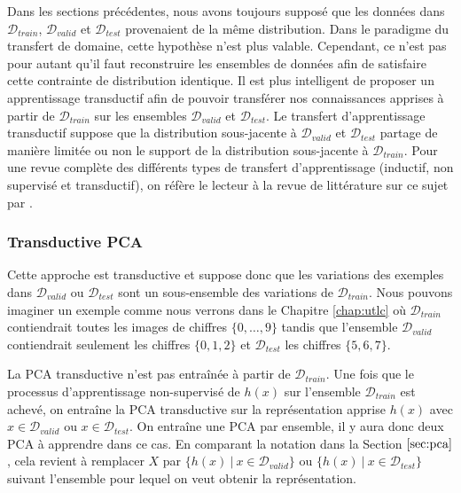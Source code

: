 Dans les sections précédentes, nous avons toujours supposé que les données dans
$\mathcal{D}_{train}$, $\mathcal{D}_{valid}$ et $\mathcal{D}_{test}$
provenaient de la même distribution. Dans le paradigme du transfert de domaine,
cette hypothèse n'est plus valable. Cependant, ce n'est pas pour autant qu'il
faut reconstruire les ensembles de données afin de satisfaire cette
contrainte de distribution identique. Il est plus intelligent de proposer un
apprentissage transductif afin de pouvoir transférer nos connaissances apprises
à partir de $\mathcal{D}_{train}$ sur les ensembles $\mathcal{D}_{valid}$ et
$\mathcal{D}_{test}$. Le transfert d'apprentissage transductif suppose que la
distribution sous-jacente à $\mathcal{D}_{valid}$ et $\mathcal{D}_{test}$
partage de manière limitée ou non le support de la distribution sous-jacente à
$\mathcal{D}_{train}$. Pour une revue complète des différents types de
transfert d'apprentissage (inductif, non supervisé et transductif), on réfère
le lecteur à la revue de littérature sur ce sujet par \citep{Pan-transfer}.

\subsubsection{Transductive PCA}

Cette approche est transductive et suppose donc que les variations des exemples
dans $\mathcal{D}_{valid}$ ou $\mathcal{D}_{test}$ sont un sous-ensemble des
variations de $\mathcal{D}_{train}$.  Nous pouvons imaginer un exemple comme
nous verrons dans le Chapitre \ref{chap:utlc} où $\mathcal{D}_{train}$
contiendrait toutes les images de chiffres $\lbrace 0,\dots,9 \rbrace$ tandis
que l'ensemble $\mathcal{D}_{valid}$ contiendrait seulement les chiffres
$\lbrace 0,1,2 \rbrace$ et $\mathcal{D}_{test}$ les chiffres $\lbrace 5,6,7
\rbrace$.

La PCA transductive n'est pas entraînée à partir de $\mathcal{D}_{train}$. Une
fois que le processus d'apprentissage non-supervisé de $h(x)$ sur l'ensemble
$\mathcal{D}_{train}$ est achevé, on entraîne la PCA transductive sur la
représentation apprise $h(x)$ avec $x\in\mathcal{D}_{valid}$ ou
$x\in\mathcal{D}_{test}$. On entraîne une PCA par ensemble, il y aura donc deux
PCA à apprendre dans ce cas. En comparant la notation dans la Section $\ref{sec:pca}$, cela
revient à remplacer $X$ par $\lbrace h(x)~|~x\in\mathcal{D}_{valid}\rbrace$ ou
$\lbrace h(x)~|~x\in\mathcal{D}_{test}\rbrace$ suivant l'ensemble pour lequel
on veut obtenir la représentation.

